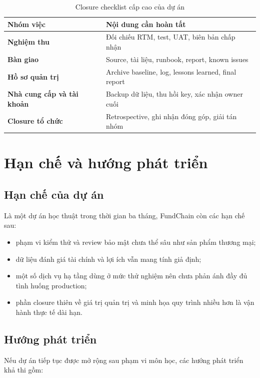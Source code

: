 \begin{table}[H]
\centering
\caption{Closure checklist cấp cao của dự án}
\label{tab:closure-checklist}
\begin{tabularx}{\textwidth}{| >{\bfseries}p{4.5cm} | X |}
\hline
Nhóm việc & Nội dung cần hoàn tất \\
\hline
Nghiệm thu & Đối chiếu RTM, test, UAT, biên bản chấp nhận \\ \hline
Bàn giao & Source, tài liệu, runbook, report, known issues \\ \hline
Hồ sơ quản trị & Archive baseline, log, lessons learned, final report \\ \hline
Nhà cung cấp và tài khoản & Backup dữ liệu, thu hồi key, xác nhận owner cuối \\ \hline
Closure tổ chức & Retrospective, ghi nhận đóng góp, giải tán nhóm \\
\hline
\end{tabularx}
\end{table}

\fi
\section{Hạn chế và hướng phát triển}

\subsection{Hạn chế của dự án}

Là một dự án học thuật trong thời gian ba tháng, FundChain còn các hạn chế sau:

\begin{itemize}
  \item phạm vi kiểm thử và review bảo mật chưa thể sâu như sản phẩm thương mại;
  \item dữ liệu đánh giá tài chính và lợi ích vẫn mang tính giả định;
  \item một số dịch vụ hạ tầng dùng ở mức thử nghiệm nên chưa phản ánh đầy đủ tình huống production;
  \item phần closure thiên về giá trị quản trị và minh họa quy trình nhiều hơn là vận hành thực tế dài hạn.
\end{itemize}

\subsection{Hướng phát triển}

Nếu dự án tiếp tục được mở rộng sau phạm vi môn học, các hướng phát triển khả thi gồm:


